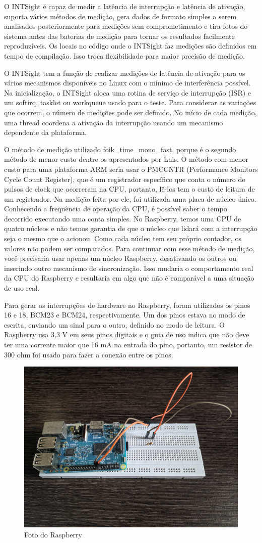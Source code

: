 O INTSight é capaz de medir a latência de interrupção e latência de ativação, suporta vários métodos de medição, gera dados de formato simples a serem analisados posteriormente para medições sem comprometimento e tira fotos do sistema antes das baterias de medição para tornar os resultados facilmente reproduzíveis. Os locais no código onde o INTSight faz medições são definidos em tempo de compilação. Isso troca flexibilidade para maior precisão de medição.

O INTSight tem a função de realizar medições de latência de ativação para os vários mecanismos disponíveis no Linux com o mínimo de interferência possível. Na inicialização, o INTSight aloca uma rotina de serviço de interrupção (ISR) e um softirq, tasklet ou workqueue usado para o teste. Para considerar as variações que ocorrem, o número de medições pode ser definido. No início de cada medição, uma thread coordena a ativação da interrupção usando um mecanismo dependente da plataforma.

O método de medição utilizado foik\_time\_mono\_fast, porque é o segundo método de menor custo dentre os apresentados por Luis. O método com menor custo para uma plataforma ARM seria usar o PMCCNTR (Performance Monitors Cycle Count Register), que é um registrador específico que conta o número de pulsos de clock que ocorreram na CPU, portanto, lê-los tem o custo de leitura de um registrador. Na medição feita por ele, foi utilizada uma placa de núcleo único. Conhecendo a frequência de operação da CPU, é possível saber o tempo decorrido executando uma conta simples. No Raspberry, temos uma CPU de quatro núcleos e não temos garantia de que o núcleo que lidará com a interrupção seja o mesmo que o acionou. Como cada núcleo tem seu próprio contador, os valores não podem ser comparados. Para continuar com esse método de medição, você precisaria usar apenas um núcleo Raspberry, desativando os outros ou inserindo outro mecanismo de sincronização. Isso mudaria o comportamento real da CPU do Raspberry e resultaria em algo que não é comparável a uma situação de uso real.

Para gerar as interrupções de hardware no Raspberry, foram utilizados os pinos 16 e 18, BCM23 e BCM24, respectivamente. Um dos pinos estava no modo de escrita, enviando um sinal para o outro, definido no modo de leitura. O Raspberry usa 3,3 V em seus pinos digitais e o guia de uso indica que não deve ter uma corrente maior que 16 mA na entrada do pino, portanto, um resistor de 300 ohm foi usado para fazer a conexão entre os pinos.

\begin{figure}[!htb]
    \centering
    \includegraphics[width=.8\textwidth]{photos/raspberry-photo.jpg}
    \caption{Foto do Raspberry}
    \label{foto:raspberry}
\end{figure}
